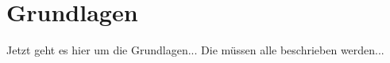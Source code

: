 \chapter{Grundlagen}
\label{ch:grundlagen}
Jetzt geht es hier um die Grundlagen... Die müssen alle beschrieben werden...